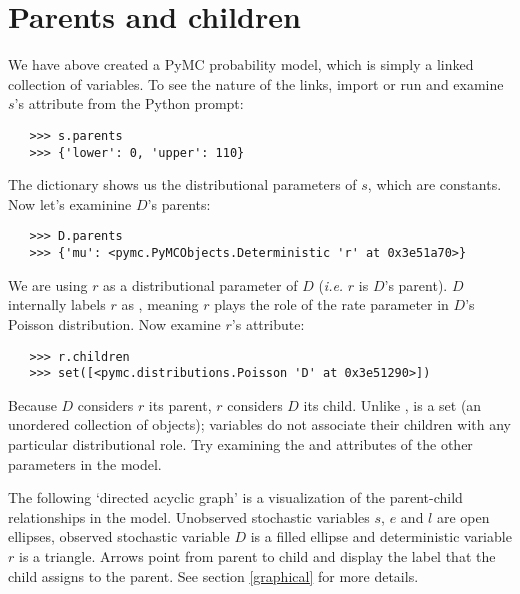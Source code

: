 \section{Parents and children}

We have above created a PyMC probability model, which is simply a linked collection of variables. To see the nature of the links, import or run  and examine $s$'s  attribute from the Python prompt:
\begin{verbatim}
   >>> s.parents
   >>> {'lower': 0, 'upper': 110}
\end{verbatim}
The  dictionary shows us the distributional parameters of $s$, which are constants. Now let's examinine $D$'s parents:
\begin{verbatim}
   >>> D.parents
   >>> {'mu': <pymc.PyMCObjects.Deterministic 'r' at 0x3e51a70>}
\end{verbatim}
We are using $r$ as a distributional parameter of $D$ (\emph{i.e.} $r$ is $D$'s parent). $D$ internally labels $r$ as , meaning $r$ plays the role of the rate parameter in $D$'s Poisson distribution. Now examine $r$'s  attribute:
\begin{verbatim}
   >>> r.children
   >>> set([<pymc.distributions.Poisson 'D' at 0x3e51290>])
\end{verbatim}
Because $D$ considers $r$ its parent, $r$ considers $D$ its child. Unlike ,  is a set (an unordered collection of objects); variables do not associate their children with any particular distributional role. Try examining the  and  attributes of the other parameters in the model.

The following `directed acyclic graph' is a visualization of the parent-child relationships in the model. Unobserved stochastic variables $s$, $e$ and $l$ are open ellipses, observed stochastic variable $D$ is a filled ellipse and deterministic variable $r$ is a triangle. Arrows point from parent to child and display the label that the child assigns to the parent. See section \ref{graphical} for more details. 
\begin{center}
\end{center}

